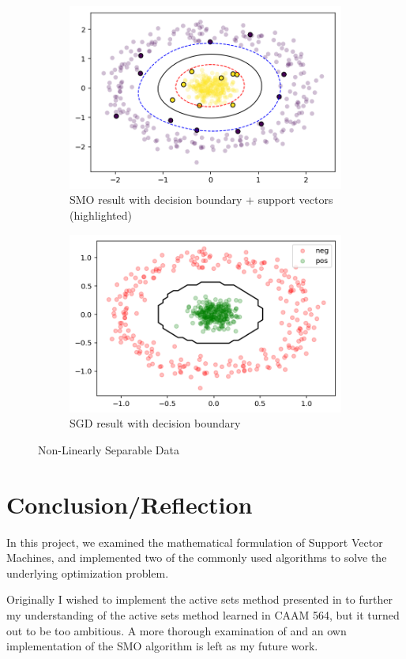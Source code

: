 \documentclass[10pt]{article}
\begin{document}
\begin{figure}
	\centering
	\begin{subfigure}{.5\textwidth}
		\centering
		\includegraphics[width=\linewidth]{fig3}
		\caption{SMO result with decision boundary + support vectors (highlighted)}
		\label{fig:nonlinearSMO}
	\end{subfigure}%
	\begin{subfigure}{.5\textwidth}
		\centering
		\includegraphics[width=\linewidth]{fig4}
		\caption{SGD result with decision boundary}
		\label{fig:nonlinearSGD}
	\end{subfigure}
	\caption{Non-Linearly Separable Data}
	\label{fig:test}
\end{figure}

\pagebreak
\clearpage

\newpage
\section{Conclusion/Reflection}
In this project, we examined the mathematical formulation of Support Vector Machines, and implemented two of the commonly used algorithms to solve the underlying optimization problem. 

Originally I wished to implement the active sets method presented in \cite{scheinberg2006efficient} to further my understanding of the active sets method learned in CAAM 564, but it turned out to be too ambitious. A more thorough examination of and an own implementation of the SMO algorithm is left as my future work.    

\clearpage
{}


	
\end{document}
